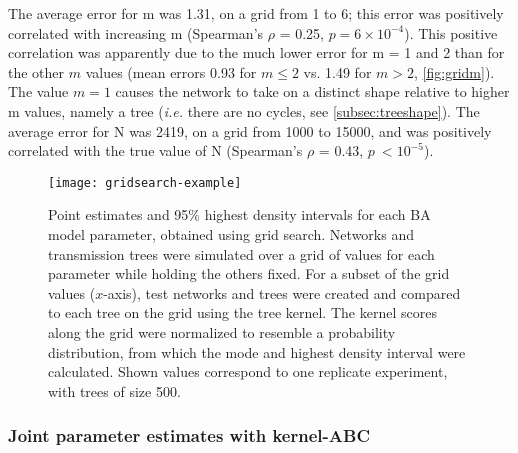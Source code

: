 The average error for \gls{m} was
    1.31,
on a grid from 1 to 6; this error was positively correlated with increasing
\gls{m}
    (Spearman's $\rho$ = 0.25,
     $p = 6\!\times\!10^{-4}$).
This positive correlation was apparently due to the much lower error for
\gls{m} = 1 and 2 than for the other $m$ values 
    (mean errors 
    0.93 
    for $m \leq 2$ vs. 
    1.49 
    for $m > 2$, \cref{fig:gridm}).
The value $m = 1$ causes the network to take on a distinct shape relative to
higher \gls{m} values, namely a tree (\textit{i.e.} there are no cycles,
see \cref{subsec:treeshape}). The average error for \gls{N} was 
    2419,
on a grid from 1000 to 15000, and was positively correlated with the true value
of \gls{N}
    (Spearman's $\rho$ = 0.43,
    $p\ {<}10^{-5}$).

\begin{figure}[ht]
  \centering
  \texttt{[image: gridsearch-example]}
  \caption[Grid search estimates of \gls{BA} model parameters]{Point estimates
      and 95\% highest density intervals for each \gls{BA} model parameter,
      obtained using grid search. Networks and transmission trees were
      simulated over a grid of values for each parameter while holding the
      others fixed. For a subset of the grid values ($x$-axis), test networks
      and trees were created and compared to each tree on the grid using the
      tree kernel. The kernel scores along the grid were normalized to resemble
      a probability distribution, from which the mode and highest density
      interval were calculated. Shown values correspond to one replicate
      experiment, with trees of size 500.
  } 
  \label{fig:gridest}
\end{figure}

\subsubsection*{Joint parameter estimates with kernel-ABC}




